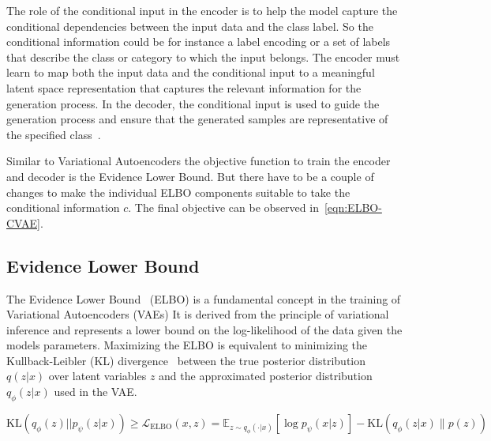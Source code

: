 The role of the conditional input in the encoder is to help the model capture the conditional dependencies between the input data and the class label. So the conditional information could be for instance a label encoding or a set of labels that describe the class or category to which the input belongs. The encoder must learn to map both the input data and the conditional input to a meaningful latent space representation that captures the relevant information for the generation process. In the decoder, the conditional input is used to guide the generation process and ensure that the generated samples are representative of the specified class~\cite{CVAE}.

Similar to Variational Autoencoders the objective function to train the encoder and decoder is the Evidence Lower Bound. But there have to be a couple of changes to make the individual ELBO components suitable to take the conditional information $c$. The final objective can be observed in~\eqref{eqn:ELBO-CVAE}.

\subsection{Evidence Lower Bound}\label{sec:ELBO}

The Evidence Lower Bound~\cite{pml2Book} (ELBO) is a fundamental concept in the training of Variational Autoencoders (VAEs)
It is derived from the principle of variational inference and represents a lower bound on the log-likelihood of the data given the models parameters. Maximizing the ELBO is equivalent to minimizing the Kullback-Leibler (KL) divergence~\cite{pml2Book} between the true posterior distribution $q(z|x)$ over latent variables $z$ and the approximated posterior distribution $q_\phi(z|x)$ used in the VAE.

\begin{equation}\label{eqn:ELBO}
	\text{KL}(q_\phi(z) ||p_\psi(z|x)) \geq \mathcal{L}_\text{ELBO}(x, z) = \mathbb{E}_{z\sim q_\phi(\cdot|x)} \left[ \log p_\psi(x|z) \right] - \text{KL}\left( q_\phi(z|x) \| p(z) \right)
\end{equation}

